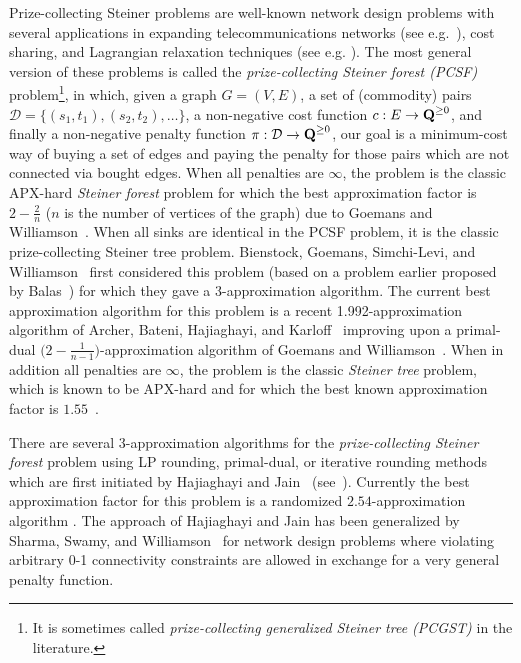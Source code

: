 \documentclass[extras,11pt]{article} \usepackage{fullpage}
\theoremstyle{mytheorem}
\newcommand{\prob}[1]{\textit{#1}}
\newcommand{\DD}{\mathcal{D}}
\newcommand{\QQ}{{\mbox{\rm\bf Q}}}
\begin{document}
Prize-collecting Steiner problems are well-known
 network design problems with several applications in
expanding telecommunications networks (see e.g.~\cite{JMP00,SCRS}),
cost sharing, and Lagrangian relaxation techniques (see e.g.
\cite{JV01,CRW01}). The most general version of these problems is
called the {\em prize-collecting Steiner forest (PCSF)}
problem\footnote{It is sometimes called
{\em prize-collecting generalized Steiner tree (PCGST)} in the literature.}, in which,
given a graph $G=(V,E)$, a set of (commodity) pairs
$\DD=\{(s_1,t_1),(s_2,t_2), \dots\}$, a non-negative cost function
$c:E\rightarrow \QQ^{\geq 0}$, and finally a non-negative penalty
function $\pi:\DD\rightarrow \QQ^{\geq 0}$, our goal is a
minimum-cost way of buying a set of edges and paying the penalty for
those pairs which are not connected via bought edges. When all
penalties are $\infty$, the problem is the classic APX-hard
\prob{Steiner forest} problem for which the best approximation
factor is $2-\frac{2}{n}$ ($n$ is the number of vertices of the
graph) due to Goemans and Williamson~\cite{GW95}. When all sinks are
identical in the PCSF problem, it is the classic prize-collecting
Steiner tree problem. Bienstock, Goemans, Simchi-Levi, and
Williamson~\cite{BGSW93} first considered this problem (based on a
problem earlier proposed by Balas~\cite{Bal89}) for which they gave
a 3-approximation algorithm.
The current best approximation algorithm for this problem is a
recent 1.992-approximation algorithm of Archer, Bateni, Hajiaghayi,
and Karloff~\cite{ABHK09} improving upon a primal-dual
$\big(2-\frac{1}{n-1}\big)$-approximation algorithm of Goemans
and Williamson~\cite{GW95}. When in addition all penalties are
$\infty$, the problem is the classic \prob{Steiner tree} problem,
which is known to be APX-hard \cite{cr:7} and for which the best
known approximation factor is $1.55$~\cite{cr:31}.


  There are several
$3$-approximation algorithms for the \prob{prize-collecting Steiner forest}
problem using LP rounding, primal-dual, or iterative rounding methods which
are first initiated by Hajiaghayi and Jain~\cite{HJ06}
(see~\cite{BGSW93,Hajiagha:iter}).
Currently the best approximation factor for this problem is a
randomized $2.54$-approximation algorithm \cite{HJ06}. The approach
of Hajiaghayi and Jain has been generalized by Sharma, Swamy, and
Williamson~\cite{SSW07} for network design problems where violating
arbitrary 0-1 connectivity constraints are allowed in exchange for a
very general penalty function.
\end{document}
